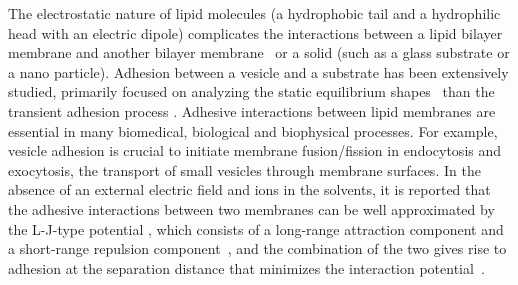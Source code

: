 \documentclass[prf,superscriptaddress,showpacs]{revtex4-1}
\begin{document}
%
The electrostatic nature of lipid molecules (a hydrophobic tail and a hydrophilic head
with an electric dipole) complicates the interactions between a lipid
bilayer membrane and another bilayer
membrane~\cite{EvansMetcalfe1984_BJ, Book_PhysicalBasisCellAdhesion,Book_IntermolecularSurfaceForces,PerutkovaFrank-Bertoncelij2013_CSB} 
or a solid (such as a glass substrate
or a nano particle).  Adhesion between a vesicle and a substrate has been extensively studied,
primarily focused on analyzing the static equilibrium
shapes~\cite{Seifert1990_PRA, ShiFengGao2006_ActaMechSin,
LinFreund2007_IntJSolidsStructures, das2008adhesion, zhang2009phase,SteinkuhlerAgudo-Canalejo2016_BJ}
than the transient adhesion process \cite{cantat1999lift, suk-sei2001, BlountMiksisDavis2013_PRSa}.
%
Adhesive interactions between lipid membranes are essential in many biomedical, biological and biophysical
processes.  For example, vesicle adhesion is crucial to initiate membrane
fusion/fission in endocytosis and exocytosis, the transport of small
vesicles through membrane surfaces.
In the absence of an external electric field and ions in the solvents, 
it is reported that 
the adhesive interactions between two membranes can be well approximated by the 
L-J-type potential \cite{FlormannAouane2017_SciReports}, which consists of a long-range attraction component and a
short-range repulsion component~\cite{Book_IntermolecularSurfaceForces},
and the combination of the two gives rise to adhesion at the separation
distance that minimizes the interaction
potential~\cite{Book_IntermolecularSurfaceForces}. 
\end{document}
